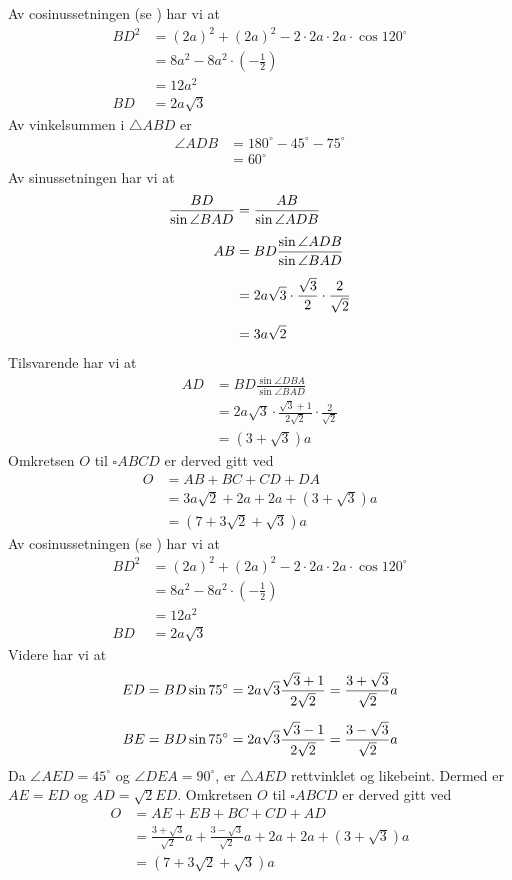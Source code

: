Av cosinussetningen (se ) har vi at
\begin{align*}
	BD^2 &= (2a)^2+(2a)^2-2\cdot2a\cdot 2a\cdot \cos 120^\circ \\
	&= 8a^2-8a^2\cdot\left(-\frac{1}{2}\right) \\
	&= 12a^2 \\
	BD &= 2a\sqrt{3}
\end{align*}
Av vinkelsummen i $\triangle ABD$ er 
\begin{align*}
	\angle ADB&=180^\circ-45^\circ-75^\circ \\
	&= 60^\circ
\end{align*}
Av sinussetningen har vi at
\begin{align*}
	\frac{BD}{\sin \angle BAD} &= \frac{AB}{\sin \angle ADB} \br
	AB &= BD\frac{\sin \angle ADB}{\sin \angle BAD} \br
	&= 2a\sqrt{3}\cdot \frac{\sqrt{3}}{2}\cdot\frac{2}{\sqrt{2}} \br
	&= 3a\sqrt{2}
\end{align*}
Tilsvarende har vi at
\begin{align*}
	AD &= BD\frac{\sin \angle DBA}{\sin \angle BAD} \\
	&= 2a\sqrt{3}\cdot \frac{\sqrt{3}+1}{2\sqrt{2}}\cdot \frac{2}{\sqrt{2}} \\
	&= (3+\sqrt{3})a
\end{align*}
Omkretsen $O$ til $\square ABCD$ er derved gitt ved
\begin{align*}
	O &= AB+BC+CD+DA \\
	&= 3a\sqrt{2} + 2a + 2a + (3+\sqrt{3})a \\
	&=(7+3\sqrt{2}+\sqrt{3})a
\end{align*}
\newpage
{}
Av cosinussetningen (se ) har vi at
\begin{align*}
	BD^2 &= (2a)^2+(2a)^2-2\cdot2a\cdot 2a\cdot \cos 120^\circ \\
	&= 8a^2-8a^2\cdot\left(-\frac{1}{2}\right) \\
	&= 12a^2 \\
	BD &= 2a\sqrt{3}
\end{align*}
Videre har vi at
\begin{align*}
	ED &= BD\sin 75^\circ =2a\sqrt{3}\frac{\sqrt{3}+1}{2\sqrt{2}}=\frac{3+\sqrt{3}}{\sqrt{2}}a \vn
	BE &= BD\sin 75^\circ =2a\sqrt{3}\frac{\sqrt{3}-1}{2\sqrt{2}}=\frac{3-\sqrt{3}}{\sqrt{2}}a
\end{align*}
Da $\angle AED=45^\circ$ og $\angle DEA=90^\circ$, er $\triangle AED$ rettvinklet og likebeint. Dermed er $AE=ED$ og $AD=\sqrt{2}ED$. Omkretsen $O$ til $\square ABCD$ er derved gitt ved
\begin{align*}
	O &= AE+EB+BC+CD+AD \\
	&= \frac{3+\sqrt{3}}{\sqrt{2}}a+\frac{3-\sqrt{3}}{\sqrt{2}}a+2a+2a+(3+\sqrt{3})a \\
	&= (7+3\sqrt{2}+\sqrt{3})a
\end{align*}


